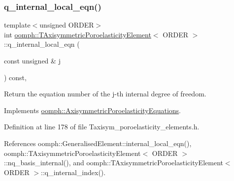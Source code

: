 \mbox{\label{classoomph_1_1TAxisymmetricPoroelasticityElement_ae13e181da7a330ebe62cc51d50584942}} 
\subsubsection{\texorpdfstring{q\+\_\+internal\+\_\+local\+\_\+eqn()}{q\_internal\_local\_eqn()}}
{\footnotesize\ttfamily template$<$unsigned O\+R\+D\+ER$>$ \\
int \hyperlink{classoomph_1_1TAxisymmetricPoroelasticityElement}{oomph\+::\+T\+Axisymmetric\+Poroelasticity\+Element}$<$ O\+R\+D\+ER $>$\+::q\+\_\+internal\+\_\+local\+\_\+eqn (\begin{DoxyParamCaption}\item[{const unsigned \&}]{j }\end{DoxyParamCaption}) const\hspace{0.3cm}{\ttfamily [inline]}, {\ttfamily [virtual]}}



Return the equation number of the j-\/th internal degree of freedom. 



Implements \hyperlink{classoomph_1_1AxisymmetricPoroelasticityEquations_a310a9bba22acd741c86d3e67940b5935}{oomph\+::\+Axisymmetric\+Poroelasticity\+Equations}.



Definition at line 178 of file Taxisym\+\_\+poroelasticity\+\_\+elements.\+h.



References oomph\+::\+Generalised\+Element\+::internal\+\_\+local\+\_\+eqn(), oomph\+::\+T\+Axisymmetric\+Poroelasticity\+Element$<$ O\+R\+D\+E\+R $>$\+::nq\+\_\+basis\+\_\+internal(), and oomph\+::\+T\+Axisymmetric\+Poroelasticity\+Element$<$ O\+R\+D\+E\+R $>$\+::q\+\_\+internal\+\_\+index().

\mbox{\label{classoomph_1_1TAxisymmetricPoroelasticityElement_a4e741ac6c7cacf006e930b0793d6797f}} 
